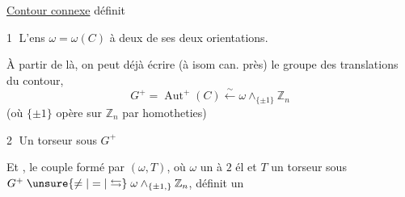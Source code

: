 \uline{Contour  connexe}  définit

\textcircled{1} L'ens $\omega=\omega(C)$ à deux  de ses deux orientations.

À partir de là, on peut déjà écrire (à isom can. près) le groupe des translations du contour, 
\[
 G^+=\operatorname{Aut}^+(C)\xleftarrow{\sim}\omega\wedge_{\{\pm1\}}\mathbb Z_n
\]
(où $\{\pm1\}$ opère sur $\mathbb Z_n$ par homotheties)

\textcircled{2} Un torseur sous $G^+$

 Et , le couple formé par $(\omega,T)$, où $\omega$ un  à $2$ él et $T$ un torseur sous $G^+\mathrel{\unsure{\ne|=|\leftrightarrows}}\omega\wedge_{\{\pm1,\}}\mathbb Z_n$, définit un
